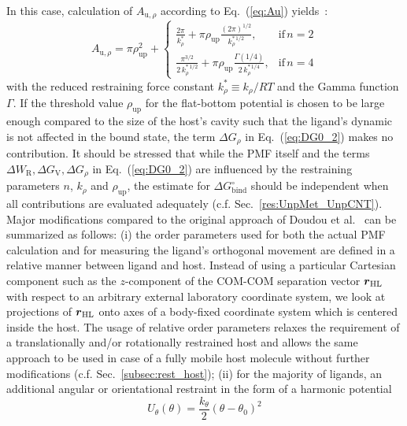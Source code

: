 \documentclass[9pt,lessons,pubversion]{livecoms}
\begin{document}
%
In this case, calculation of $A_{\mathrm{u},\rho}$ according to Eq.~(\ref{eq:Au}) yields~\cite{markthaler2017molecular}:
\begin{equation}
A_{\mathrm{u},\rho}  
		= \pi \rho_\mathrm{up}^2 +
		\left\{\begin{array}{ll} 
		\frac{2 \pi}{k_\rho^{*}} + \pi \rho_\mathrm{up} \frac{(2 \pi)^{1/2}}{k_\rho^{*\, 1/2}}, & \mathrm{if} \, n = 2 \\
		\frac{\pi^{3/2}}{2\, k_\rho^{*\, 1/2}} + \pi \rho_\mathrm{up} \frac{\Gamma(1/4)}{2\, k_\rho^{*\, 1/4}}, & \mathrm{if} \, n = 4
		\end{array}\right. 
\label{eq:Au_2}
\end{equation}
with the reduced restraining force constant $k_\rho^{*} \equiv k_\rho/RT$ and the Gamma function $\Gamma$.
%
If the threshold value $\rho_\mathrm{up}$ for the flat-bottom potential is chosen to be large enough compared to the size of the host's cavity 
such that the ligand's dynamic is not affected in the bound state, the term $\Delta G_\rho$ in Eq.~(\ref{eq:DG0_2}) makes no contribution.
It should be stressed that while the PMF itself and the terms $\Delta W_\mathrm{R}, \Delta G_\mathrm{V}, \Delta G_\rho$ in Eq.~(\ref{eq:DG0_2}) are influenced by the restraining parameters 
$n$, $k_\rho$ and $\rho_\mathrm{up}$, the estimate for $\Delta G^\circ_\mathrm{bind}$ should be independent when all contributions are evaluated adequately (c.f. Sec.~\ref{res:UnpMet_UnpCNT}).
%
Major modifications compared to the original approach of Doudou et al.~\cite{doudou2009standard} can be summarized as follows:
(i) the order parameters used for both the actual PMF calculation and for measuring the ligand's orthogonal movement are defined in a relative manner between ligand and host. 
Instead of using a particular Cartesian component such as the $z$-component of the COM-COM separation vector $\text{\boldmath $r$}_\mathrm{HL}$ with respect to an arbitrary external laboratory coordinate system, 
we look at projections of $\text{\boldmath $r$}_\mathrm{HL}$ onto axes of a body-fixed coordinate system which is centered inside the host.
The usage of relative order parameters relaxes the requirement of a translationally and/or rotationally restrained host and allows the same approach to be used in case of a fully mobile host molecule without further modifications (c.f. Sec.~\ref{subsec:rest_host});
(ii) for the majority of ligands, an additional angular or orientational restraint in the form of a harmonic potential 
\begin{equation}
U_\theta(\theta) = \frac{k_\theta}{2}(\theta-\theta_0)^2
\label{eq:ori_restr}
\end{equation}
\end{document}

